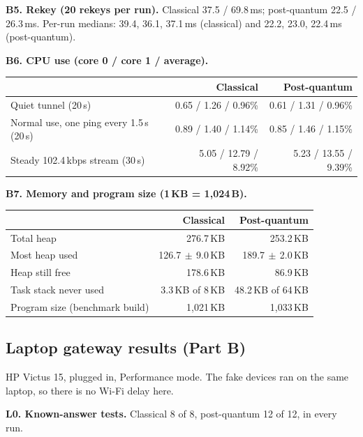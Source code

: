 \documentclass[10pt,a4paper]{article}
\newcommand{\PM}{\ensuremath{\,\pm\,}}
\begin{document}
\textbf{B5. Rekey (20 rekeys per run).} Classical 37.5 / 69.8\,ms; post-quantum 22.5 / 26.3\,ms.
Per-run medians: 39.4, 36.1, 37.1\,ms (classical) and 22.2, 23.0, 22.4\,ms (post-quantum).

\textbf{B6. CPU use (core 0 / core 1 / average).}
\begin{table}[H]\centering\small
\begin{tabular}{lrr}
\toprule
 & Classical & Post-quantum \\
\midrule
Quiet tunnel (20\,s) & 0.65 / 1.26 / 0.96\% & 0.61 / 1.31 / 0.96\% \\
Normal use, one ping every 1.5\,s (20\,s) & 0.89 / 1.40 / 1.14\% & 0.85 / 1.46 / 1.15\% \\
Steady 102.4\,kbps stream (30\,s) & 5.05 / 12.79 / 8.92\% & 5.23 / 13.55 / 9.39\% \\
\bottomrule
\end{tabular}
\end{table}

\textbf{B7. Memory and program size (1\,KB = 1,024\,B).}
\begin{table}[H]\centering\small
\begin{tabular}{lrr}
\toprule
 & Classical & Post-quantum \\
\midrule
Total heap & 276.7\,KB & 253.2\,KB \\
Most heap used & 126.7\PM9.0\,KB & 189.7\PM2.0\,KB \\
Heap still free & 178.6\,KB & 86.9\,KB \\
Task stack never used & 3.3\,KB of 8\,KB & 48.2\,KB of 64\,KB \\
Program size (benchmark build) & 1,021\,KB & 1,033\,KB \\
\bottomrule
\end{tabular}
\end{table}

\subsection*{Laptop gateway results (Part B)}

HP Victus 15, plugged in, Performance mode. The fake devices ran on the same laptop, so there is no
Wi-Fi delay here.

\textbf{L0. Known-answer tests.} Classical 8 of 8, post-quantum 12 of 12, in every run.
\end{document}
